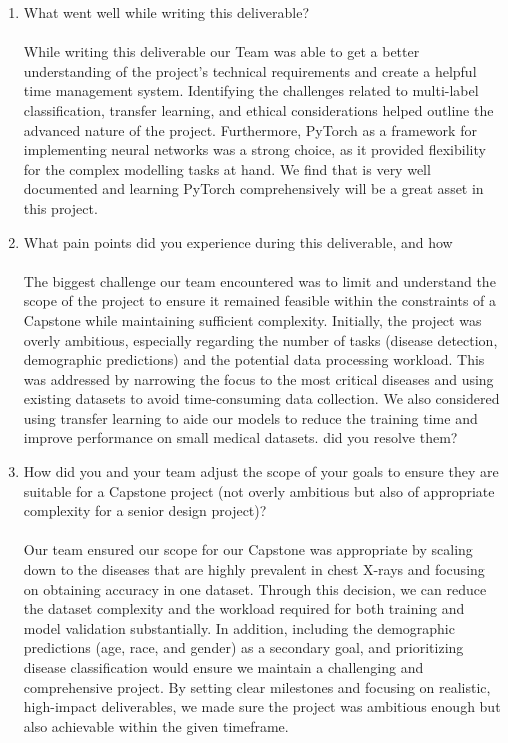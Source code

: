 \documentclass{article}
\begin{document}
\begin{enumerate}
    \item What went well while writing this deliverable? \\\\
While writing this deliverable our Team was able to get a better understanding of the project’s technical requirements and create a helpful time management system. Identifying the challenges related to multi-label classification, transfer learning, and ethical considerations helped outline the advanced nature of the project. Furthermore, PyTorch as a framework for implementing neural networks was a strong choice, as it provided flexibility for the complex modelling tasks at hand. We find that is very well documented and learning PyTorch comprehensively will be a great asset in this project.  
    \item What pain points did you experience during this deliverable, and how \\\\
    The biggest challenge our team encountered was to limit and understand the scope of the project to ensure it remained feasible within the constraints of a Capstone while maintaining sufficient complexity. Initially, the project was overly ambitious, especially regarding the number of tasks (disease detection, demographic predictions) and the potential data processing workload. This was addressed by narrowing the focus to the most critical diseases and using existing datasets to avoid time-consuming data collection. We also considered using transfer learning to aide our models to reduce the training time and improve performance on small medical datasets.
    did you resolve them?
    \item How did you and your team adjust the scope of your goals to ensure
    they are suitable for a Capstone project (not overly ambitious but also of
    appropriate complexity for a senior design project)? \\\\
    Our team ensured our scope for our Capstone was appropriate by scaling down to the diseases that are highly prevalent in chest X-rays and focusing on obtaining accuracy in one dataset. Through this decision, we can reduce the dataset complexity and the workload required for both training and model validation substantially. In addition, including the demographic predictions (age, race, and gender) as a secondary goal, and prioritizing disease classification would ensure we maintain a challenging and comprehensive project. By setting clear milestones and focusing on realistic, high-impact deliverables, we made sure the project was ambitious enough but also achievable within the given timeframe.
\end{enumerate}  
\end{document}
